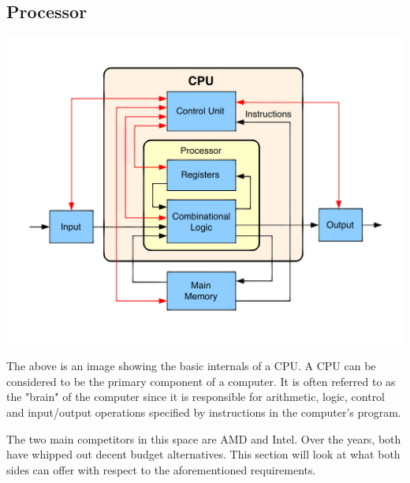 \documentclass[12pt, a4paper]{article}
\begin{document}
\subsection{Processor}
\begin{center}
  \includegraphics[scale=0.15]{cpu.png}
\end{center}

The above is an image showing the basic internals of a CPU. A CPU can be 
considered to be the primary component of a computer. It is often 
referred to as the "brain" of the computer since it is responsible
for arithmetic, logic, control and input/output operations specified by 
instructions in the computer's program. 

The two main competitors in this space are AMD and Intel. Over the years,
both have whipped out decent budget alternatives. This section will look
at what both sides can offer with respect to the aforementioned 
requirements.
\end{document}
